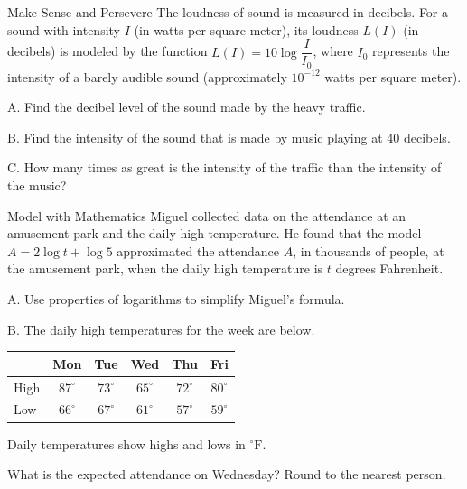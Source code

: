 \documentclass{article}
\newenvironment{practice}[2]{}{}        %
\newcommand{\answer}[1]{}               %
\newcommand{\placeholder}[2]{}          %
\begin{document}
\begin{practice}{36}{2}
Make Sense and Persevere The loudness of sound is measured in decibels. For a sound with intensity $I$ (in watts per square meter), its loudness $L(I)$ (in decibels) is modeled by the function $L(I)=10\log\dfrac{I}{I_0}$, where $I_0$ represents the intensity of a barely audible sound (approximately $10^{-12}$ watts per square meter).

\placeholder{illustration}{Street scene with heavy traffic labeled "Heavy Traffic: intensity of I = 10^{-4} watts per square meter" and a person with headphones labeled "Music through headphones: 40 dB."}

A. Find the decibel level of the sound made by the heavy traffic.

B. Find the intensity of the sound that is made by music playing at 40 decibels.

C. How many times as great is the intensity of the traffic than the intensity of the music?

\answer{A. 80 dB; B. $10^{-8}\,\mathrm{W/m^2}$; C. 10,000 times}
\end{practice}

\begin{practice}{37}{2}
Model with Mathematics Miguel collected data on the attendance at an amusement park and the daily high temperature. He found that the model $A=2\log t+\log5$ approximated the attendance $A$, in thousands of people, at the amusement park, when the daily high temperature is $t$ degrees Fahrenheit.

A. Use properties of logarithms to simplify Miguel's formula.

B. The daily high temperatures for the week are below.

\begin{tabular}{lccccc}
\toprule
& Mon & Tue & Wed & Thu & Fri \\
\midrule
High & $87^\circ$ & $73^\circ$ & $65^\circ$ & $72^\circ$ & $80^\circ$ \\
Low & $66^\circ$ & $67^\circ$ & $61^\circ$ & $57^\circ$ & $59^\circ$ \\
\bottomrule
\end{tabular}

Daily temperatures show highs and lows in $^\circ\mathrm{F}$.

What is the expected attendance on Wednesday? Round to the nearest person.

\answer{A. $A=\log(5t^2)$; B. 4,325 people}
\end{practice}
\end{document}
